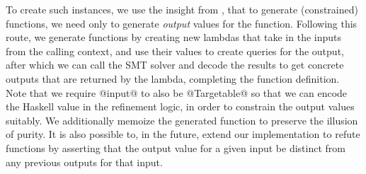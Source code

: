 To create such instances, we use the insight from 
\quickcheck, that to generate (constrained) functions,
we need only to generate \emph{output} values for the function. 
%
Following this route, we generate functions by creating 
new lambdas that take in the inputs from the calling context, 
and use their values to create queries for the output, after 
which we can call the SMT solver and decode the results 
to get concrete outputs that are returned by the lambda, 
completing the function definition. 
%
Note that we require @input@ to also be @Targetable@
so that we can encode the Haskell value in the refinement logic,
in order to constrain the output values suitably.
%
We additionally memoize the generated function to preserve the 
illusion of purity. 
%
It is also possible to, in the future, extend our 
implementation to refute functions by asserting 
that the output value for a given input be distinct 
from any previous outputs for that input.
